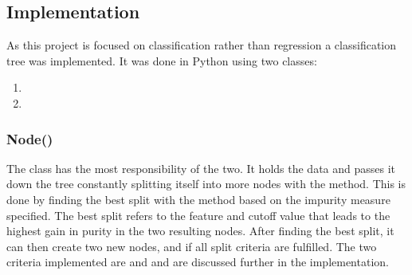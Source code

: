 \subsection{Implementation}
As this project is focused on classification rather than regression a classification tree was implemented.
It was done in Python using two classes:\\
\begin{enumerate}
    \item {}
    \item {}
    \end{enumerate}
\vspace{10pt}

\subsubsection{Node()}
The  class has the most responsibility of the two.
It holds the data and passes it down the tree constantly splitting itself into more nodes with the  method.
This is done by finding the best split with the  method based on the impurity measure specified.
The best split refers to the feature and cutoff value that leads to the highest gain in purity in the two resulting nodes.
After finding the best split, it can then create two new nodes,  and  if all split criteria are fulfilled.
The two criteria implemented are  and  and are discussed further in the  implementation.

